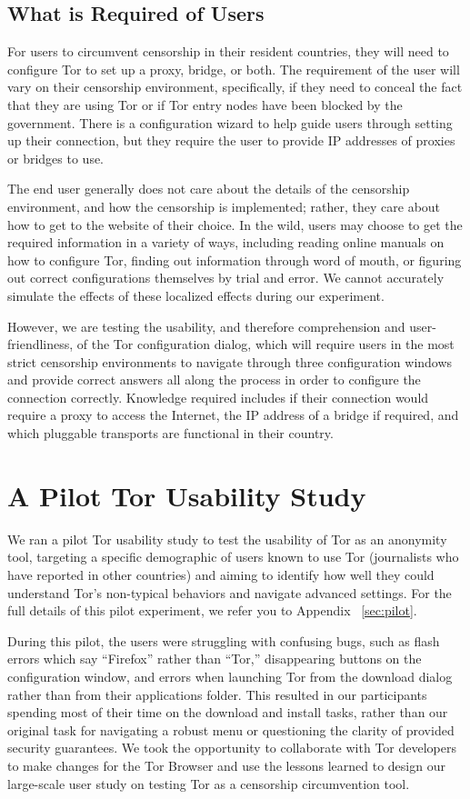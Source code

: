 \documentclass[letterpaper,twocolumn,11pt]{article}
\begin{document}
\subsection{What is Required of Users}
\indent \indent For users to circumvent censorship in their resident countries, they will need to 
configure Tor to set up a proxy, bridge, or both. The requirement of the user will vary on their censorship
environment, specifically, if they need to conceal the fact that they are using Tor or if Tor entry nodes 
have been blocked by the government. There is a configuration wizard to help guide users through setting up their connection, but they require the user to provide IP addresses of proxies or bridges to use.

The end user generally does not care about the details of the 
censorship environment, and how the censorship is implemented; rather, they care about how to get
to the website of their choice. In the wild, users may choose to get the required information in a variety 
of ways, including reading online manuals on how to configure Tor, finding out information through word of mouth, 
or figuring out correct configurations themselves by trial and error.  We cannot accurately simulate the effects
of these localized effects during our experiment.

However, we are testing the usability, and therefore comprehension and user-friendliness, of the Tor configuration 
dialog, which will require users in the most strict censorship environments to navigate through three configuration windows and provide correct answers all along the process in order to configure the connection correctly. Knowledge
required includes if their connection would require a proxy to access the Internet, the IP address of a bridge if required, 
and which pluggable transports are functional in their country. 

\section{A Pilot Tor Usability Study} 
\indent \indent We ran a pilot Tor usability study to test the usability of Tor as an anonymity tool,
targeting a specific demographic of users known to use Tor (journalists who have reported in other
countries) and aiming to identify how well they could understand Tor's non-typical behaviors and 
navigate advanced settings. For the full details of this pilot experiment, we refer you to Appendix ~\ref{sec:pilot}.  

During this pilot, the users were struggling with confusing bugs, such as flash errors which
say ``Firefox'' rather than ``Tor,'' disappearing buttons on the configuration window, and errors when
launching Tor from the download dialog rather than from their applications folder. This resulted in our 
participants spending most of their time on the download and install tasks, rather than 
our original task for navigating a robust menu or questioning the clarity of provided security 
guarantees. We took the opportunity to collaborate with Tor developers to make changes for the Tor 
Browser and use the lessons learned to design our large-scale user study on testing Tor as a 
censorship circumvention tool. 
\end{document}
